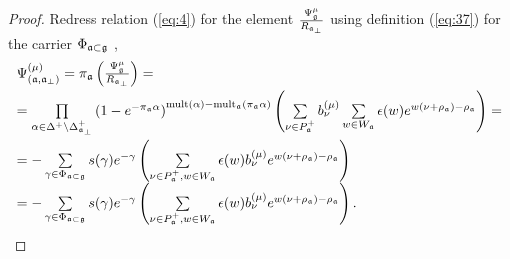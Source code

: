 \begin{proof}
Redress relation (\ref{eq:4}) for the element $
\frac{\Psi _{\frak{g}}^{\mu }}{R_{\mathfrak{a}_{\perp }}}$ using definition (\ref{eq:37})
for the carrier $\Phi _{\mathfrak{a}\subset \frak{g}}$ ,
\begin{equation*}
\begin{array}{l}
\Psi ^{\left( \mu \right) }_{\left(  \af, \afb \right)}
=\pi _{\frak{a}}\left( \frac{\Psi _{\frak{g}}^{\mu }}{R_{\af_{\perp }}}%
\right) = \\[2mm]
=\prod\limits_{\alpha \in \Delta ^{+}\setminus \Delta _{\afb }^{+}}\left(
1-e^{-\pi _{\af}\alpha }\right) ^{\mathrm{mult}(\alpha )-\mathrm{mult}_{%
\af}(\pi _{\af}\alpha )}\left( \sum\limits_{\nu \in P_{\af%
}^{+}}b_{\nu }^{(\mu )}\sum\limits_{w\in W_{\af}}\epsilon (w)e^{w(\nu
+\rho _{\af})-\rho _{\af}}\right) = \\[5mm]
=-\sum\limits_{\gamma \in \Phi _{\af\subset \frak{g}}}s(\gamma
)e^{-\gamma }\left( \sum\limits_{\nu \in P_{\af}^{+},w\in W_{\af%
}}\epsilon (w)b_{\nu }^{(\mu )}e^{w(\nu +\rho _{\af})-\rho _{\af%
}}\right)  \\
=-\sum\limits_{\gamma \in \Phi _{\af\subset \frak{g}}}s(\gamma
)e^{-\gamma }\left( \sum\limits_{\nu \in P_{\af}^{+},w\in W_{\af%
}}\epsilon (w)b_{\nu }^{(\mu )}e^{w(\nu +\rho _{\af})-\rho _{\af%
}}\right) .
\end{array}
\end{equation*}


\end{proof}
